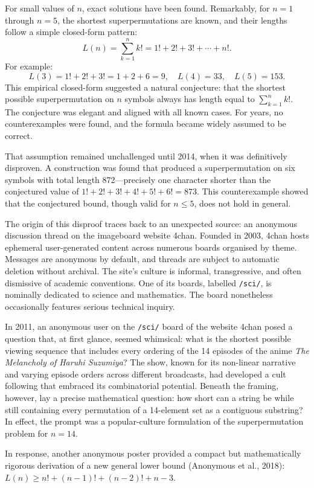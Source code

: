 For small values of $n$, exact solutions have been found. Remarkably, for $n = 1$ through $n = 5$, the shortest superpermutations are known, and their lengths follow a simple closed-form pattern:
\[
L(n) = \sum_{k=1}^n k! = 1! + 2! + 3! + \cdots + n!.
\]
For example:
\[
L(3) = 1! + 2! + 3! = 1 + 2 + 6 = 9, \quad
L(4) = 33, \quad
L(5) = 153.
\]
This empirical closed-form suggested a natural conjecture: that the shortest possible superpermutation on $n$ symbols always has length equal to $\sum_{k=1}^n k!$. The conjecture was elegant and aligned with all known cases. For years, no counterexamples were found, and the formula became widely assumed to be correct.

That assumption remained unchallenged until 2014, when it was definitively disproven. A construction was found that produced a superpermutation on six symbols with total length 872—precisely one character shorter than the conjectured value of $1! + 2! + 3! + 4! + 5! + 6! = 873$. This counterexample showed that the conjectured bound, though valid for $n \leq 5$, does not hold in general.

The origin of this disproof traces back to an unexpected source: an anonymous discussion thread on the imageboard website 4chan. Founded in 2003, 4chan hosts ephemeral user-generated content across numerous boards organised by theme. Messages are anonymous by default, and threads are subject to automatic deletion without archival. The site's culture is informal, transgressive, and often dismissive of academic conventions. One of its boards, labelled \texttt{/sci/}, is nominally dedicated to science and mathematics. The board nonetheless occasionally features serious technical inquiry.

In 2011, an anonymous user on the \texttt{/sci/} board of the website 4chan posed a question that, at first glance, seemed whimsical: what is the shortest possible viewing sequence that includes every ordering of the 14 episodes of the anime \emph{The Melancholy of Haruhi Suzumiya}? The show, known for its non-linear narrative and varying episode orders across different broadcasts, had developed a cult following that embraced its combinatorial potential. Beneath the framing, however, lay a precise mathematical question: how short can a string be while still containing every permutation of a 14-element set as a contiguous substring? In effect, the prompt was a popular-culture formulation of the superpermutation problem for $n = 14$.

In response, another anonymous poster provided a compact but mathematically rigorous derivation of a new general lower bound (Anonymous et al., 2018): $L(n) \geq n! + (n - 1)! + (n - 2)! + n - 3$.

